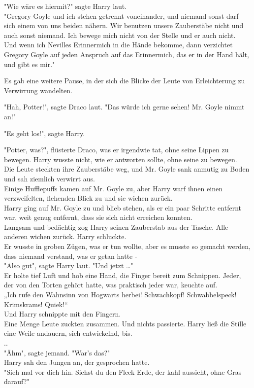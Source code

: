 {"Wie wäre es hiermit?" sagte Harry laut.\\ "Gregory Goyle und ich stehen getrennt voneinander, und niemand sonst darf sich einem von uns beiden nähern. Wir benutzen unsere Zauberstäbe nicht und auch sonst niemand. Ich bewege mich nicht von der Stelle und er auch nicht.\\ Und wenn ich Nevilles Erinnermich in die Hände bekomme, dann verzichtet Gregory Goyle auf jeden Anspruch auf das Erinnermich, das er in der Hand hält, und gibt es mir."

Es gab eine weitere Pause, in der sich die Blicke der Leute von Erleichterung zu Verwirrung wandelten.

"Hah, Potter!", sagte Draco laut. "Das würde ich gerne sehen! Mr. Goyle nimmt an!"

"Es geht los!", sagte Harry.

"Potter, was?", flüsterte Draco, was er irgendwie tat, ohne seine Lippen zu bewegen. Harry wusste nicht, wie er antworten sollte, ohne seine zu bewegen.\\ Die Leute steckten ihre Zauberstäbe weg, und Mr. Goyle sank anmutig zu Boden und sah ziemlich verwirrt aus.\\ Einige Hufflepuffs kamen auf Mr. Goyle zu, aber Harry warf ihnen einen\\ verzweifelten, flehenden Blick zu und sie wichen zurück.\\ Harry ging auf Mr. Goyle zu und blieb stehen, als er ein paar Schritte entfernt war, weit genug entfernt, dass sie sich nicht erreichen konnten.\\ Langsam und bedächtig zog Harry seinen Zauberstab aus der Tasche. Alle anderen wichen zurück. Harry schluckte.\\ Er wusste in groben Zügen, was er tun wollte, aber es musste so gemacht werden, dass niemand verstand, was er getan hatte -\\ "Also gut", sagte Harry laut. "Und jetzt …"\\ Er holte tief Luft und hob eine Hand, die Finger bereit zum Schnippen. Jeder, der von den Torten gehört hatte, was praktisch jeder war, keuchte auf.\\ „Ich rufe den Wahnsinn von Hogwarts herbei! Schwachkopf! Schwabbelspeck! Krimskrams! Quiek!“\\ Und Harry schnippte mit den Fingern.\\ Eine Menge Leute zuckten zusammen. Und nichts passierte. Harry ließ die Stille eine Weile andauern, sich entwickelnd, bis.\\ ..\\ "Ähm", sagte jemand. "War's das?"\\ Harry sah den Jungen an, der gesprochen hatte.\\ "Sieh mal vor dich hin. Siehst du den Fleck Erde, der kahl aussieht, ohne Gras darauf?"

}
